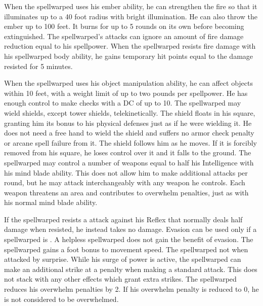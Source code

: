 When the spellwarped uses his ember ability, he can strengthen the fire so that it illuminates up to a 40 foot radius with bright illumination.
He can also throw the ember up to 100 feet.
It burns for up to 5 rounds on its own before becoming extinguished.
The spellwarped's attacks can ignore an amount of fire damage reduction equal to his spellpower.
When the spellwarped resists fire damage with his spellwarped body ability, he gains temporary hit points equal to the damage resisted for 5 minutes.

When the spellwarped uses his object manipulation ability, he can affect objects within 10 feet, with a weight limit of up to two pounds per spellpower.
He has enough control to make checks with a DC of up to 10.
The spellwarped may wield shields, except tower shields, telekinetically.
The shield floats in his square, granting him its bonus to his physical defenses just as if he were wielding it.
He does not need a free hand to wield the shield and suffers no armor check penalty or arcane spell failure from it.
The shield follows him as he moves.
If it is forcibly removed from his square, he loses control over it and it falls to the ground.
The spellwarped may control a number of weapons equal to half his Intelligence with his mind blade ability.
This does not allow him to make additional attacks per round, but he may attack interchangeably with any weapon he controls.
Each weapon threatens an area and contributes to overwhelm penalties, just as with his normal mind blade ability.

If the spellwarped resists a attack against his Reflex that normally deals half damage when resisted, he instead takes no damage.
Evasion can be used only if a spellwarped is \unencumbered.
A helpless spellwarped does not gain the benefit of evasion.
The spellwarped gains a  foot bonus to movement speed.
The spellwarped not \unaware when attacked by surprise.
While his surge of power is active, the spellwarped can make an additional strike at a  penalty when making a standard attack.
This does not stack with any other effects which grant extra strikes.
The spellwarped reduces his overwhelm penalties by 2.
If his overwhelm penalty is reduced to 0, he is not considered to be overwhelmed.

